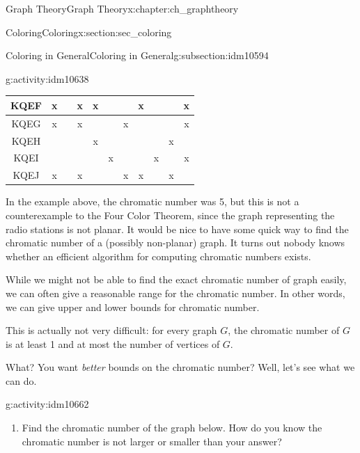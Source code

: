 \documentclass[oneside,10pt,]{book}
\numberwithin{equation}{chapter}
\begin{document}
\begin{chapterptx}{Graph Theory}{}{Graph Theory}{}{}{x:chapter:ch_graphtheory}
\begin{sectionptx}{Coloring}{}{Coloring}{}{}{x:section:sec_coloring}
\begin{subsectionptx}{Coloring in General}{}{Coloring in General}{}{}{g:subsection:idm10594}
\begin{activity}{}{g:activity:idm10638}
\begin{sidebyside}{1}{0}{0}{0}
\begin{sbspanel}{1}
{\begin{tabular}{c|c|c|c|c|c|c|c|c|c|c|}
{\tiny KQEF }&  x   &      &  x   &  x   &      &      &   x  &      &      &  x   \\ \hline
{\tiny KQEG }&  x   &      &  x   &      &      &  x   &      &      &      &  x   \\ \hline
{\tiny KQEH }&      &      &      &  x   &      &      &      &      &  x   &      \\ \hline
{\tiny KQEI }&      &      &      &      &  x   &      &      &  x   &      &  x   \\ \hline
{\tiny KQEJ }&  x   &      &  x   &      &      &  x   &   x  &      &  x   &      \\ \hline
\end{tabular}
}%
\end{sbspanel}%
\end{sidebyside}%
\end{activity}
In the example above, the chromatic number was 5, but this is not a counterexample to the Four Color Theorem, since the graph representing the radio stations is not planar. It would be nice to have some quick way to find the chromatic number of a (possibly non-planar) graph. It turns out nobody knows whether an efficient algorithm for computing chromatic numbers exists.%
\par
While we might not be able to find the exact chromatic number of graph easily, we can often give a reasonable range for the chromatic number. In other words, we can give upper and lower bounds for chromatic number.%
\par
This is actually not very difficult: for every graph \(G\), the chromatic number of \(G\) is at least 1 and at most the number of vertices of \(G\).%
\par
What? You want \emph{better} bounds on the chromatic number? Well, let's see what we can do.%
\begin{activity}{}{g:activity:idm10662}%
\begin{enumerate}[font=\bfseries,label=(\alph*),ref=\alph*]
\item{}Find the chromatic number of the graph below.  How do you know the chromatic number is not larger or smaller than your answer?%
\begin{sidebyside}{1}{0.375}{0.375}{0}%
\begin{sbspanel}{0.25}%
\end{sbspanel}
\end{sidebyside}
\end{enumerate}
\end{activity}
\end{subsectionptx}
\end{sectionptx}
\end{chapterptx}
\end{document}
